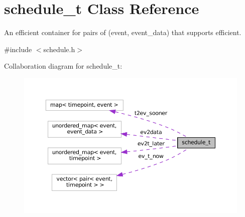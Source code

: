 \hypertarget{classschedule__t}{}\section{schedule\+\_\+t Class Reference}
\label{classschedule__t}


An efficient container for pairs of (event, event\+\_\+data) that supports efficient.  




{\ttfamily \#include $<$schedule.\+h$>$}



Collaboration diagram for schedule\+\_\+t\+:
\nopagebreak
\begin{figure}[H]
\begin{center}
\leavevmode
\includegraphics[width=350pt]{d2/db1/classschedule__t__coll__graph}
\end{center}
\end{figure}
